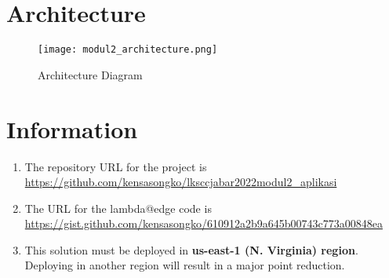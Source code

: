 \documentclass{article}
\begin{document}
\section{Architecture}
\begin{figure}[h]
\centering
\texttt{[image: modul2\_architecture.png]}
\caption{\label{fig:architecture}Architecture Diagram}
\end{figure}

\section{Information}\label{information}
\begin{enumerate}
    \item The repository URL for the project is \href{https://github.com/kensasongko/lksccjabar2022modul2_aplikasi}{https://github.com/kensasongko/lksccjabar2022modul2\_aplikasi}
    \item The URL for the lambda@edge code is \href{https://gist.github.com/kensasongko/610912a2b9a645b00743c773a00848ea}{https://gist.github.com/kensasongko/610912a2b9a645b00743c773a00848ea}
    \item This solution must be deployed in \textbf{us-east-1 (N. Virginia) region}. Deploying in another region will result in a major point reduction.
\end{enumerate}
\end{document}

